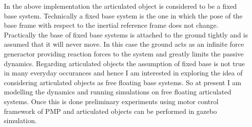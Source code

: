 \documentclass[12pt,a4paper]{report}
\begin{document}
In the above implementation the articulated object is considered to be a fixed base system. Technically a fixed base system is the one in which the pose of the base frame with respect to the inertial reference frame does not change. Practically the base of fixed base systems is attached to the ground tightly and is assumed that it will never move. In this case the ground acts as an infinite force generactor providing reaction forces to the system and greatly limits the passive dynamics. Regarding articulated objects the assumption of fixed base is not true in many everyday occurances and hence I am interested in exploring the idea of considering articulated objects as free floating base systems. So at present I am modelling the dynamics and running simulations on free floating articulated systems. Once this is done preliminary experiments using motor control framework of PMP and articulated objects can be performed in gazebo simulation. 
\end{document}
